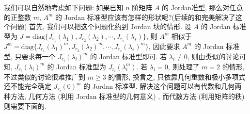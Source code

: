 \documentclass[../../main.tex]{subfiles}%
\begin{document}
\vspace{0.5cm}

我们可以自然地考虑如下问题: 如果已知 $n$ 阶矩阵 $A$ 的 Jordan准型, 那么对任意的正整数 $m$, $A^m$ 的 Jordan 标准型应该有怎样的形状呢?(后续的和完美解决了这个问题) 首先, 我们可以把这个问题化约到 Jordan 块的情形. 设 $A$ 的 Jordan 标准型为 $J = \mathrm{diag}\{J_{r_1}(\lambda_1),J_{r_2}(\lambda_2),\cdots,J_{r_s}(\lambda_s)\}$, 则 $A^m$ 相似于 $J^m = \mathrm{diag}\{J_{r_1}(\lambda_1)^m,J_{r_2}(\lambda_2)^m,\cdots,J_{r_s}(\lambda_s)^m\}$, 因此要求 $A^m$ 的 Jordan 标准型, 只要求每一个 $J_{r_i}(\lambda_i)^m$ 的 Jordan 标准型即可. 若 $\lambda_i \neq 0$, 则由类似的讨论可知, $J_{r_i}(\lambda_i)^m$ 的 Jordan 标准型为 $J_{r_i}(\lambda_i^m)$. 若 $\lambda_i = 0$, 则处理了 $m = 2$ 的情形, 不过类似的讨论很难推广到 $m \geqslant  3$ 的情形, 换言之, 只依靠几何重数和极小多项式还不能完全确定 $J_{r_i}(0)^m$ 的 Jordan 标准型. 解决这个问题可以有代数和几何两种方法, 几何方法 (利用 Jordan 标准型的几何意义) , 而代数方法 (利用矩阵的秩) 则需要下面的.
\end{document}
